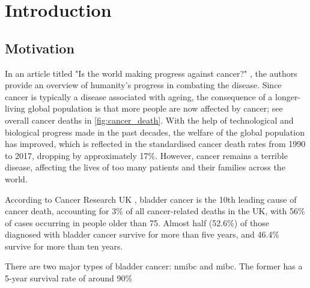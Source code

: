
\chapter{Introduction}

\vspace{3mm}
\vspace{3mm}


\section{Motivation}


In an article titled "Is the world making progress against cancer?" \citep{Roser2015-qb}, the authors provide an overview of humanity's progress in combating the disease. Since cancer is typically a disease associated with ageing, the consequence of a longer-living global population is that more people are now affected by cancer; see overall cancer deaths in \cref{fig:cancer_death}. With the help of technological and biological progress made in the past decades, the welfare of the global population has improved, which is reflected in the standardised cancer death rates from 1990 to 2017, dropping by approximately 17\%. However, cancer remains a terrible disease, affecting the lives of too many patients and their families across the world.

According to Cancer Research UK \citep{Cancer_Research_UK2015-cf}, bladder cancer is the 10th leading cause of cancer death, accounting for 3\% of all cancer-related deaths in the UK, with 56\% of cases occurring in people older than 75. Almost half (52.6\%) of those diagnosed with bladder cancer survive for more than five years, and 46.4\% survive for more than ten years.

There are two major types of bladder cancer: \acrfull{nmibc} and \acrfull{mibc}. The former has a 5-year survival rate of around 90\% %

